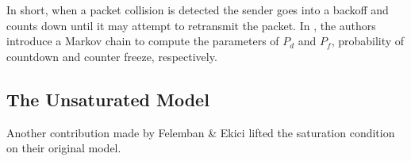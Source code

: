 In short, when a packet collision is detected the sender goes into a backoff and counts down until it may attempt to retransmit the packet. In \cite{felemban}, the authors introduce a Markov chain to compute the parameters of $P_d$ and $P_f$, probability of countdown and counter freeze, respectively.

\subsection{The Unsaturated Model}

Another contribution made by Felemban \& Ekici lifted the saturation condition on their original model.